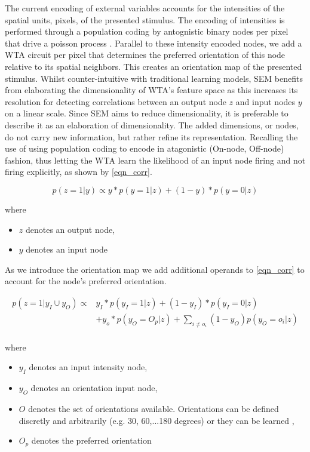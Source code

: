 \documentclass{report}
\begin{document}
The current encoding of external variables accounts for the intensities of the spatial units, pixels, of the presented stimulus. The encoding of intensities is performed through a population coding by antognistic binary nodes per pixel that drive a poisson process \cite{Nessler2010}. Parallel to these intensity encoded nodes, we add a WTA circuit per pixel that determines the preferred orientation of this node relative to its spatial neighbors. This creates an orientation map of the presented stimulus. Whilst counter-intuitive with traditional learning models, SEM benefits from elaborating the dimensionality of WTA's feature space as this increases its resolution for detecting correlations between an output node $z$ and input nodes $y$ on a linear scale. Since SEM aims to reduce dimensionality, it is preferable to describe it as an elaboration of dimensionality. The added dimensions, or nodes, do not carry new information, but rather refine its representation. Recalling the use of using population coding to encode in atagonistic (On-node, Off-node) fashion, thus letting the WTA learn the likelihood of an input node firing and not firing explicitly, as shown by \ref{eqn_corr}.

\begin{equation}
	p(z=1|y) \propto y*p(y=1|z) + (1-y)*p(y=0|z)
	\label{eqn_corr}
\end{equation}

where
\begin{itemize}
  \item $z$ denotes an output node,
  \item $y$ denotes an input node
\end{itemize}

As we introduce the orientation map we add additional operands to \ref{eqn_corr} to account for the node's preferred orientation.

\begin{equation}
	\begin{split}
		p(z=1|y_I \cup y_O) \propto &y_I*p(y_I=1|z) + (1-y_I)*p(y_I=0|z) \\
			&+ y_o*p(y_O=O_p|z)+\sum_{i\neq o_i} (1-y_O)p(y_O=o_i|z)\\
	\end{split}
	\label{eqn_corr2}
\end{equation}

where
\begin{itemize}
  \item $y_I$ denotes an input intensity node,
  \item $y_O$ denotes an orientation input node,
  \item $O$ denotes the set of orientations available. Orientations can be defined discretly and arbitrarily (e.g. 30, 60,...180 degrees) or they can be learned \cite{Nessler2010},
  \item $O_p$ denotes the preferred orientation
\end{itemize}
\end{document}
